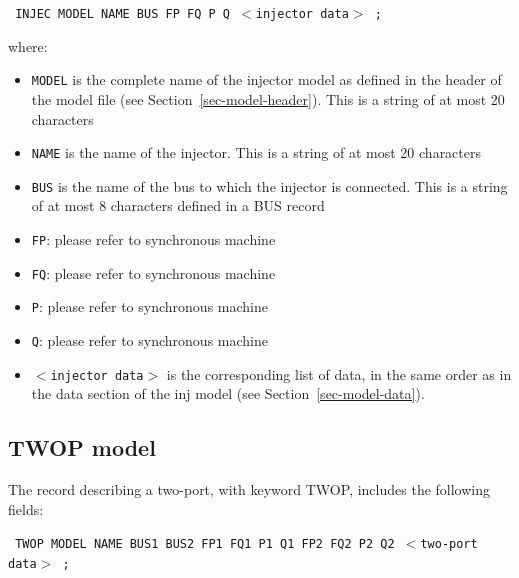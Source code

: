 {\tt \hspace*{5ex} INJEC  MODEL  NAME  BUS  FP  FQ  P  Q $<$injector data$>$ ;}

where:
\begin{itemize}
\item{\tt MODEL} is the complete name of the injector model as defined in the header of the model file (see Section~\ref{sec-model-header}). This is a string of at most 20 characters
\item{\tt NAME} is the name of the injector.  This is a string of at most 20 characters
\item{\tt BUS} is the name of the bus to which the injector is connected. This is a string of at most 8 characters defined in a BUS record
\item{\tt FP}: please refer to synchronous machine
\item{\tt FQ}: please refer to synchronous machine
\item{\tt P}: please refer to synchronous machine
\item{\tt Q}: please refer to synchronous machine
\item{\tt $<$injector data$>$} is the corresponding list of data, in the same order as in the data section of the inj model (see Section~\ref{sec-model-data}).
\end{itemize}

\subsection{TWOP model}

The record describing a two-port, with keyword TWOP, includes the following fields:

{\tt \hspace*{1ex} TWOP  MODEL  NAME  BUS1  BUS2 FP1  FQ1  P1  Q1  FP2  FQ2  P2  Q2 $<$two-port data$>$ ;}

